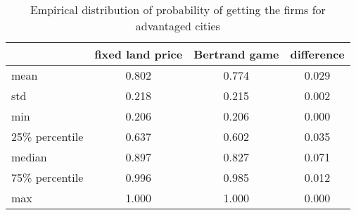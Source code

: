 \begin{table}[H]
\centering
\caption{Empirical distribution of probability of getting the firms for advantaged cities}
\label{table: allocation_efficiency}
\begin{tabular}{lccc}
\toprule
 & fixed land price & Bertrand game & difference \\
\midrule
mean & 0.802 & 0.774 & 0.029 \\
std & 0.218 & 0.215 & 0.002 \\
min & 0.206 & 0.206 & 0.000 \\
25\% percentile & 0.637 & 0.602 & 0.035 \\
median & 0.897 & 0.827 & 0.071 \\
75\% percentile & 0.996 & 0.985 & 0.012 \\
max & 1.000 & 1.000 & 0.000 \\
\bottomrule
\end{tabular}
\end{table}

